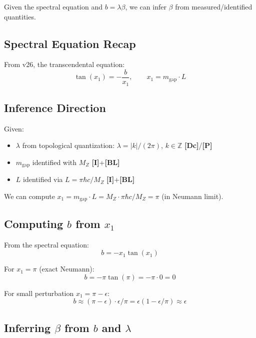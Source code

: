 \documentclass[11pt,a4paper]{article}
\newcommand{\mgap}{m_{\mathrm{gap}}}
\newcommand{\MZ}{M_Z}
\newcommand{\tagDc}{\textbf{[Dc]}}
\newcommand{\tagI}{\textbf{[I]}}
\newcommand{\tagBL}{\textbf{[BL]}}
\newcommand{\tagP}{\textbf{[P]}}
\theoremstyle{definition}
\theoremstyle{plain}
\theoremstyle{remark}
\begin{document}
Given the spectral equation and $b = \lambda\beta$, we can infer $\beta$ from measured/identified quantities.

\subsection{Spectral Equation Recap}

From v26, the transcendental equation:
\begin{equation}
\tan(x_1) = -\frac{b}{x_1}, \qquad x_1 = \mgap \cdot L
\label{eq:spectral-recap}
\end{equation}

\subsection{Inference Direction}

Given:
\begin{itemize}
\item $\lambda$ from topological quantization: $\lambda = |k|/(2\pi)$, $k \in \mathbb{Z}$ \tagDc{}/\tagP{}
\item $\mgap$ identified with $\MZ$ \tagI{}+\tagBL{}
\item $L$ identified via $L = \pi\hbar c/\MZ$ \tagI{}+\tagBL{}
\end{itemize}

We can compute $x_1 = \mgap \cdot L = \MZ \cdot \pi\hbar c/\MZ = \pi$ (in Neumann limit).

\subsection{Computing $b$ from $x_1$}

From the spectral equation:
\begin{equation}
b = -x_1 \tan(x_1)
\label{eq:b-from-x1}
\end{equation}

For $x_1 = \pi$ (exact Neumann):
\begin{equation}
b = -\pi \tan(\pi) = -\pi \cdot 0 = 0
\label{eq:b-neumann}
\end{equation}

For small perturbation $x_1 = \pi - \epsilon$:
\begin{equation}
b \approx (\pi - \epsilon) \cdot \epsilon/\pi = \epsilon(1 - \epsilon/\pi) \approx \epsilon
\label{eq:b-perturbed}
\end{equation}

\subsection{Inferring $\beta$ from $b$ and $\lambda$}
\end{document}
